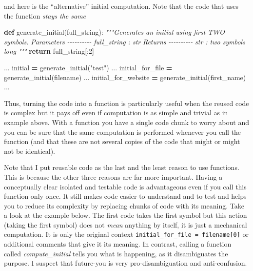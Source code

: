 \documentclass[
]{book}
\newenvironment{Shaded}{\begin{snugshade}}{\end{snugshade}}
\newcommand{\CommentTok}[1]{\textcolor[rgb]{0.56,0.35,0.01}{\textit{#1}}}
\newcommand{\ControlFlowTok}[1]{\textcolor[rgb]{0.13,0.29,0.53}{\textbf{#1}}}
\newcommand{\DecValTok}[1]{\textcolor[rgb]{0.00,0.00,0.81}{#1}}
\newcommand{\KeywordTok}[1]{\textcolor[rgb]{0.13,0.29,0.53}{\textbf{#1}}}
\newcommand{\NormalTok}[1]{#1}
\newcommand{\OperatorTok}[1]{\textcolor[rgb]{0.81,0.36,0.00}{\textbf{#1}}}
\newcommand{\StringTok}[1]{\textcolor[rgb]{0.31,0.60,0.02}{#1}}
\begin{document}
and here is the ``alternative'' initial computation. Note that the code that uses the function \emph{stays the same}

\begin{Shaded}
\begin{Highlighting}[]
\KeywordTok{def}\NormalTok{ generate\_initial(full\_string):}
    \CommentTok{"""Generates an initial using first TWO symbols.}
\CommentTok{    }
\CommentTok{    Parameters}
\CommentTok{    {-}{-}{-}{-}{-}{-}{-}{-}{-}{-}}
\CommentTok{    full\_string : str}
\CommentTok{    }
\CommentTok{    Returns}
\CommentTok{    {-}{-}{-}{-}{-}{-}{-}{-}{-}{-}}
\CommentTok{    str : two symbols long}
\CommentTok{    """}
    \ControlFlowTok{return}\NormalTok{ full\_string[:}\DecValTok{2}\NormalTok{]}

\NormalTok{...}
\NormalTok{initial }\OperatorTok{=}\NormalTok{ generate\_initial(}\StringTok{"test"}\NormalTok{)}
\NormalTok{...}
\NormalTok{initial\_for\_file }\OperatorTok{=}\NormalTok{ generate\_initial(filename)}
\NormalTok{...}
\NormalTok{initial\_for\_website }\OperatorTok{=}\NormalTok{ generate\_initial(first\_name)}
\NormalTok{...}
\end{Highlighting}
\end{Shaded}

Thus, turning the code into a function is particularly useful when the reused code is complex but it pays off even if computation is as simple and trivial as in example above. With a function you have a single code chunk to worry about and you can be sure that the same computation is performed whenever you call the function (and that these are not several copies of the code that might or might not be identical).

Note that I put reusable code as the last and the least reason to use functions. This is because the other three reasons are far more important. Having a conceptually clear isolated and testable code is advantageous even if you call this function only once. It still makes code easier to understand and to test and helps you to reduce its complexity by replacing chunks of code with its meaning. Take a look at the example below. The first code takes the first symbol but this action (taking the first symbol) does not \emph{mean} anything by itself, it is just a mechanical computation. It is only the original context \texttt{initial\_for\_file\ =\ filename{[}0{]}} or additional comments that give it its meaning. In contrast, calling a function called \emph{compute\_initial} tells you what is happening, as it disambiguates the purpose. I suspect that future-you is very pro-disambiguation and anti-confusion.
\end{document}
